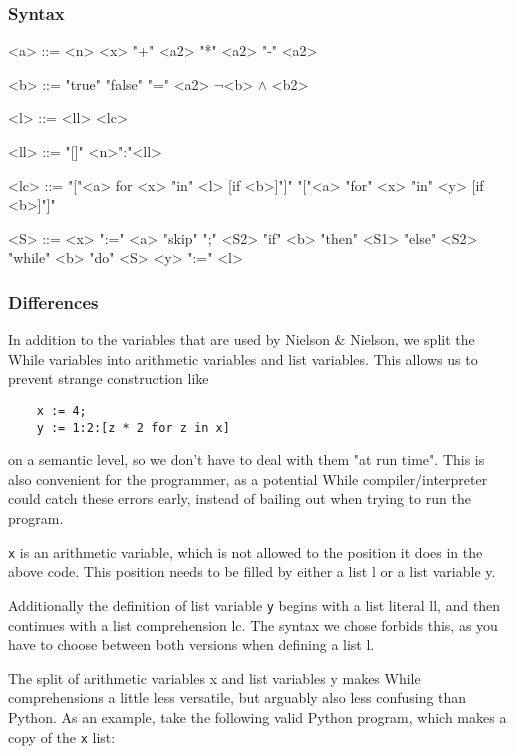 \documentclass[12pt]{article}
\newcommand\mono\texttt
\newcommand{\metavar}[1]{\textlangle#1\textrangle}
\newcommand{\Ntwo}{Nielson \& Nielson}
\begin{document}
\subsubsection{Syntax}

\begin{grammar}
    <a> ::= <n>
    \alt <x>
     "+" <a2>
     "*" <a2>
     "-" <a2>

    <b> ::= "true"
    \alt "false"
     "=" <a2>
    \alt $\lnot$<b>
     $\land$ <b2>

    <l> ::= <ll>
    \alt <lc>

    <ll> ::= "[]"
    \alt <n>":"<ll>

    <lc> ::= "["<a> for <x> "in" <l> [if <b>]"]"
    \alt "["<a> "for" <x> "in" <y> [if <b>]"]"

    <S> ::= <x> ":=" <a>
    \alt "skip"
     ";" <S2>
    \alt "if" <b> "then" <S1> "else" <S2>
    \alt "while" <b> "do" <S>
    \alt <y> ":=" <l>
\end{grammar}

\subsubsection{Differences}

In addition to the variables that are used by \Ntwo \cite{wiley}, we split the While variables into arithmetic variables and list variables. This allows us to prevent strange construction like

\begin{lstlisting}
    x := 4;
    y := 1:2:[z * 2 for z in x]
\end{lstlisting}

on a semantic level, so we don't have to deal with them "at run time". This is also convenient for the programmer, as a potential While compiler/interpreter could catch these errors early, instead of bailing out when trying to run the program.

\mono{x} is an arithmetic variable, which is not allowed to the position it does in the above code. This position needs to be filled by either a list \metavar{l} or a list variable \metavar{y}.

Additionally the definition of list variable \mono{y} begins with a list literal \metavar{ll}, and then continues with a list comprehension \metavar{lc}. The syntax we chose forbids this, as you have to choose between both versions when defining a list \metavar{l}.

The split of arithmetic variables \metavar{x} and list variables \metavar{y} makes While comprehensions a little less versatile, but arguably also less confusing than Python. As an example, take the following valid Python program, which makes a copy of the \mono{x} list:
\end{document}
